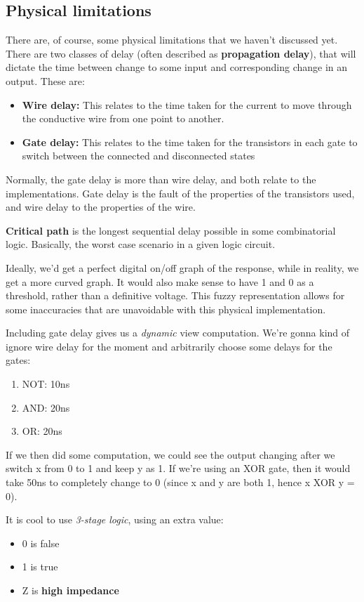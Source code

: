 \documentclass[11pt,a4paper,titlepage,dvipsnames,cmyk]{scrartcl}
\begin{document}
\subsection{Physical limitations}%
\label{sub:Physical limitations}
There are, of course, some physical limitations that we haven't discussed
yet. There are two classes of delay (often described as
\textbf{propagation delay}), that will dictate the time between change to
some input and corresponding change in an output. These are:
\begin{itemize}
    \item \textbf{Wire delay:} This relates to the time taken for the
        current to move through the conductive wire from one point to
        another.
    \item \textbf{Gate delay:} This relates to the time taken for the
        transistors in each gate to switch between the connected and
        disconnected states
\end{itemize}
Normally, the gate delay is more than wire delay, and both relate to the
implementations. Gate delay is the fault of the properties of the
transistors used, and wire delay to the properties of the wire.

\textbf{Critical path} is the longest sequential delay possible in some
combinatorial logic. Basically, the worst case scenario in a given logic
circuit.

Ideally, we'd get a perfect digital on/off graph of the response, while in
reality, we get a more curved graph. It would also make sense to have 1
and 0 as a threshold, rather than a definitive voltage. This fuzzy
representation allows for some inaccuracies that are unavoidable with this
physical implementation.

Including gate delay gives us a \textit{dynamic} view computation. We're
gonna kind of ignore wire delay for the moment and arbitrarily choose some
delays for the gates:
\begin{enumerate}
    \item NOT: 10ns
    \item AND: 20ns
    \item OR: 20ns
\end{enumerate}

If we then did some computation, we could see the output changing after we
switch x from 0 to 1 and keep y as 1. If we're using an XOR gate, then it
would take 50ns to completely change to 0 (since x and y are both 1, hence
x XOR y = 0).

It is cool to use \textit{3-stage logic}, using an extra value:
\begin{itemize}
    \item 0 is false
    \item 1 is true
    \item Z is \textbf{high impedance}
\end{itemize}
\end{document}
